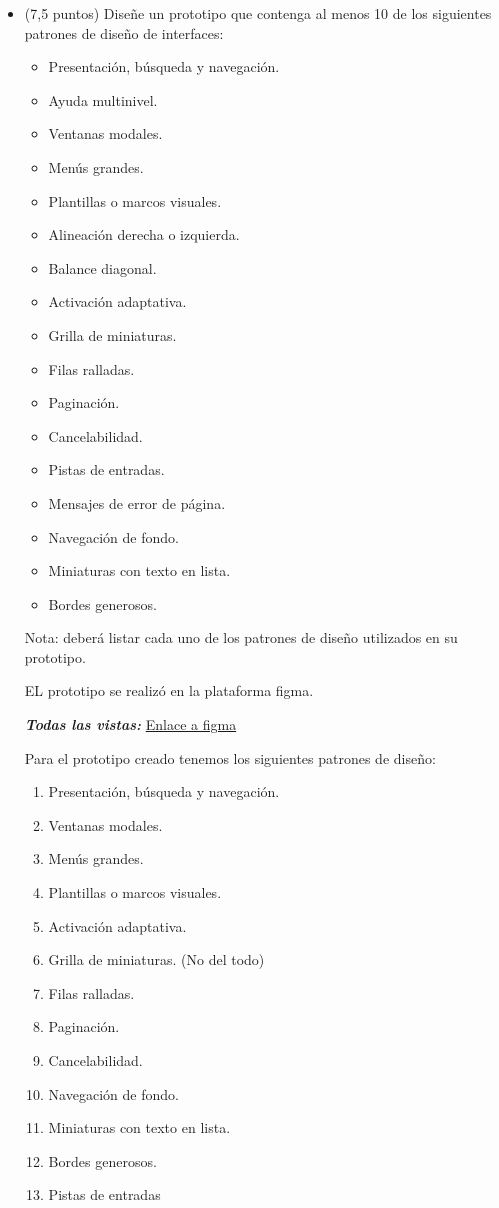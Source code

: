 \documentclass[a4paper,12pt]{article}
\begin{document}
\begin{itemize}

\item (7,5 puntos) Diseñe un prototipo que contenga al menos 10 de los siguientes patrones de diseño de interfaces:

\begin{itemize}
\item Presentación, búsqueda y navegación.
\item Ayuda multinivel.
\item Ventanas modales.
\item Menús grandes.
\item Plantillas o marcos visuales.
\item Alineación derecha o izquierda.
\item Balance diagonal.
\item Activación adaptativa.
\item Grilla de miniaturas.
\item Filas ralladas.
\item Paginación.
\item Cancelabilidad.
\item Pistas de entradas.
\item Mensajes de error de página.
\item Navegación de fondo.
\item Miniaturas con texto en lista.
\item Bordes generosos.
\end{itemize}

Nota: deberá listar cada uno de los patrones de diseño utilizados en su prototipo.

\newpage

EL prototipo se realizó en la plataforma figma.

\textit{\textbf{Todas las vistas: }} \href{https://www.figma.com/file/C2ED1xTr9Cfrh11yfhRsQ3/Examen2_Interfaces?type=design&node-id=0%3A1&mode=design&t=bNsMEHtXuUzC87qG-1}{Enlace a figma}

Para el prototipo creado tenemos los siguientes patrones de diseño:
\begin{enumerate}
\item Presentación, búsqueda y navegación.
\item Ventanas modales.
\item Menús grandes.
\item Plantillas o marcos visuales.
\item Activación adaptativa.
\item Grilla de miniaturas. (No del todo)
\item Filas ralladas.
\item Paginación.
\item Cancelabilidad.
\item Navegación de fondo.
\item Miniaturas con texto en lista.
\item Bordes generosos.
\item Pistas de entradas
\end{enumerate}


\end{itemize}
\end{document}
